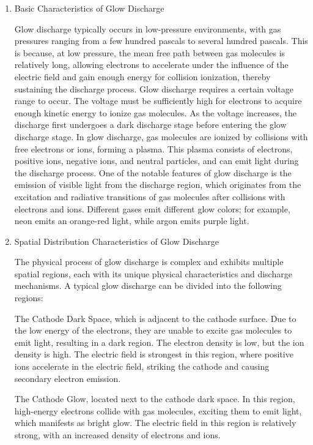 \begin{enumerate}
	\item Basic Characteristics of Glow Discharge
	
	Glow discharge typically occurs in low-pressure environments, with gas pressures ranging from a few hundred pascals to several hundred pascals. This is because, at low pressure, the mean free path between gas molecules is relatively long, allowing electrons to accelerate under the influence of the electric field and gain enough energy for collision ionization, thereby sustaining the discharge process. Glow discharge requires a certain voltage range to occur. The voltage must be sufficiently high for electrons to acquire enough kinetic energy to ionize gas molecules. As the voltage increases, the discharge first undergoes a dark discharge stage before entering the glow discharge stage. In glow discharge, gas molecules are ionized by collisions with free electrons or ions, forming a plasma. This plasma consists of electrons, positive ions, negative ions, and neutral particles, and can emit light during the discharge process. One of the notable features of glow discharge is the emission of visible light from the discharge region, which originates from the excitation and radiative transitions of gas molecules after collisions with electrons and ions. Different gases emit different glow colors; for example, neon emits an orange-red light, while argon emits purple light.
	
	\item Spatial Distribution Characteristics of Glow Discharge
	
	The physical process of glow discharge is complex and exhibits multiple spatial regions, each with its unique physical characteristics and discharge mechanisms. A typical glow discharge can be divided into the following regions:
	
	The Cathode Dark Space, which is adjacent to the cathode surface. Due to the low energy of the electrons, they are unable to excite gas molecules to emit light, resulting in a dark region. The electron density is low, but the ion density is high. The electric field is strongest in this region, where positive ions accelerate in the electric field, striking the cathode and causing secondary electron emission.
	
	The Cathode Glow, located next to the cathode dark space. In this region, high-energy electrons collide with gas molecules, exciting them to emit light, which manifests as bright glow. The electric field in this region is relatively strong, with an increased density of electrons and ions.
	

\end{enumerate}
